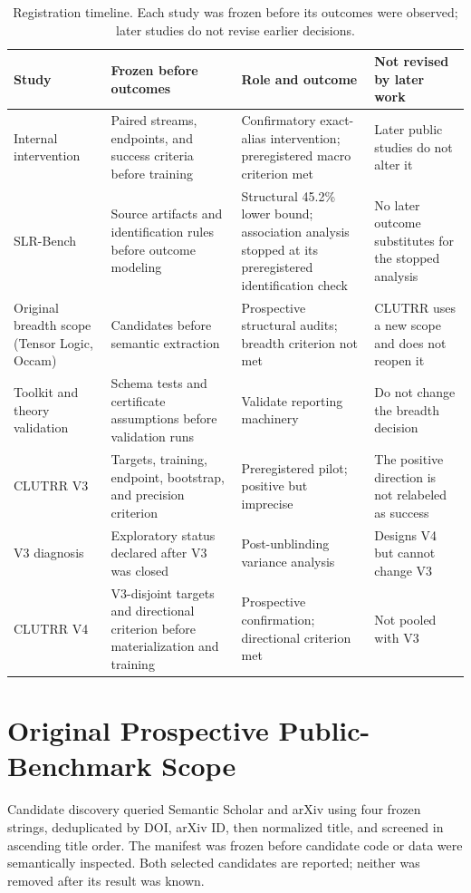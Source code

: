 \begin{table}[H]
\caption{Registration timeline.  Each study was frozen before its outcomes
were observed; later studies do not revise earlier decisions.}
\label{tab:stage-timeline}
\centering
\scriptsize
\setlength{\tabcolsep}{2pt}
\begin{tabular}{L{0.85in}L{1.45in}L{1.8in}L{1.45in}}
\toprule
Study & Frozen before outcomes & Role and outcome & Not revised by later work \\
\midrule
Internal intervention &
Paired streams, endpoints, and success criteria before training &
Confirmatory exact-alias intervention; preregistered macro criterion met &
Later public studies do not alter it \\
SLR-Bench &
Source artifacts and identification rules before outcome modeling &
Structural 45.2\% lower bound; association analysis stopped at its
preregistered identification check &
No later outcome substitutes for the stopped analysis \\
Original breadth scope (Tensor Logic, Occam) &
Candidates before semantic extraction &
Prospective structural audits; breadth criterion not met &
CLUTRR uses a new scope and does not reopen it \\
Toolkit and theory validation &
Schema tests and certificate assumptions before validation runs &
Validate reporting machinery &
Do not change the breadth decision \\
CLUTRR V3 &
Targets, training, endpoint, bootstrap, and precision criterion &
Preregistered pilot; positive but imprecise &
The positive direction is not relabeled as success \\
V3 diagnosis &
Exploratory status declared after V3 was closed &
Post-unblinding variance analysis &
Designs V4 but cannot change V3 \\
CLUTRR V4 &
V3-disjoint targets and directional criterion before materialization and
training &
Prospective confirmation; directional criterion met &
Not pooled with V3 \\
\bottomrule
\end{tabular}
\end{table}

\section{Original Prospective Public-Benchmark Scope}

Candidate discovery queried Semantic Scholar and arXiv using four frozen
strings, deduplicated by DOI, arXiv ID, then normalized title, and screened in
ascending title order.  The manifest was frozen before candidate code or data
were semantically inspected.  Both selected candidates are reported; neither
was removed after its result was known.

